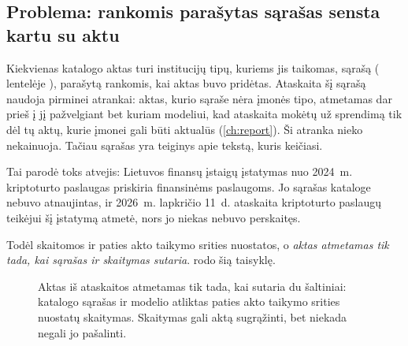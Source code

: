 \subsection{Problema: rankomis parašytas sąrašas sensta kartu su aktu}

Kiekvienas katalogo aktas turi institucijų tipų, kuriems jis taikomas, sąrašą (
lentelėje ), parašytą rankomis, kai aktas buvo pridėtas. Ataskaita šį
sąrašą naudoja pirminei atrankai: aktas, kurio sąraše nėra įmonės tipo, atmetamas dar prieš į jį
pažvelgiant bet kuriam modeliui, kad ataskaita mokėtų už sprendimą tik dėl tų aktų, kurie įmonei
gali būti aktualūs (\cref{ch:report}). Ši atranka nieko nekainuoja. Tačiau sąrašas yra teiginys
apie tekstą, kuris keičiasi.

Tai parodė toks atvejis: Lietuvos finansų įstaigų įstatymas nuo 2024~m. kriptoturto paslaugas
priskiria finansinėms paslaugoms. Jo sąrašas kataloge nebuvo atnaujintas, ir 2026~m. lapkričio
11~d. ataskaita kriptoturto paslaugų teikėjui šį įstatymą atmetė, nors jo niekas nebuvo
perskaitęs.

Todėl skaitomos ir paties akto taikymo srities nuostatos, o \emph{aktas atmetamas tik tada, kai
sąrašas ir skaitymas sutaria}.  rodo šią taisyklę.

\begin{figure}[H]
\centering
{}
\actorlegend
\caption{Aktas iš ataskaitos atmetamas tik tada, kai sutaria du šaltiniai: katalogo sąrašas ir
modelio atliktas paties akto taikymo srities nuostatų skaitymas. Skaitymas gali aktą sugrąžinti,
bet niekada negali jo pašalinti.}\label{fig:obligations:scope}
\end{figure}

